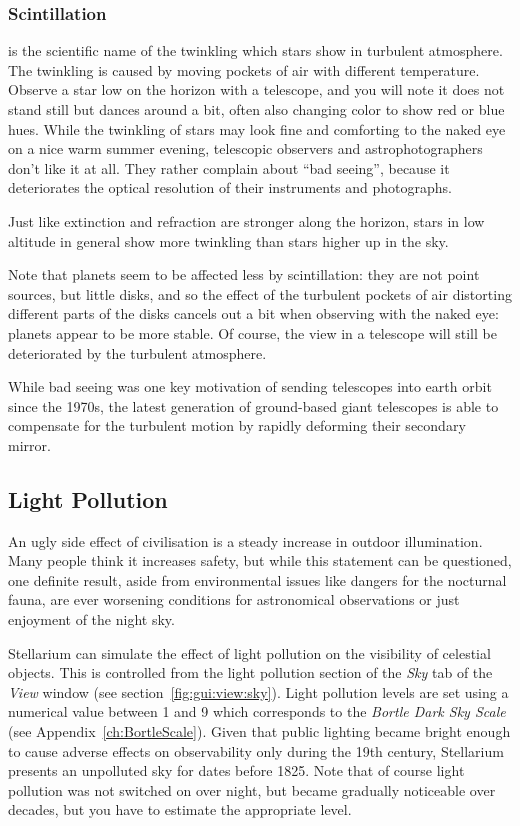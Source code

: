 \subsubsection{Scintillation}
\label{sec:phenomena:Scintillation}
 is the scientific name of the twinkling which stars show
in turbulent atmosphere. The twinkling is caused by moving pockets of air with different temperature. 
Observe a star low on the horizon with a telescope, and you will note it does not stand still 
but dances around a bit, often also changing color to show red or blue hues.
While the twinkling of stars may look fine and comforting to the naked eye on a nice warm summer evening, 
telescopic observers and astrophotographers don't like it at all. They rather complain about ``bad seeing'', 
because it deteriorates the optical resolution of their instruments and photographs. 

Just like extinction and refraction are stronger along the horizon, 
stars in low altitude in general show more twinkling than stars higher up in the sky. 

Note that planets seem to be affected less by scintillation: they are not point sources, but little disks, 
and so the effect of the turbulent pockets of air distorting different parts of the disks cancels out a bit 
when observing with the naked eye: planets appear to be more stable.
Of course, the view in a telescope will still be deteriorated by the turbulent atmosphere.

While bad seeing was one key motivation of sending telescopes into earth orbit since the 1970s, 
the latest generation of ground-based giant telescopes is able to compensate for the turbulent 
motion by rapidly deforming their secondary mirror. 



\subsection{Light Pollution}
\label{sec:phenomena:LightPollution}

An ugly side effect of civilisation is a steady increase in outdoor
illumination. Many people think it increases safety, but while this
statement can be questioned, one definite result, aside from
environmental issues like dangers for the nocturnal fauna, are ever
worsening conditions for astronomical observations or just enjoyment
of the night sky. 

Stellarium can simulate the effect of light pollution on the visibility 
of celestial objects. This is controlled from the
light pollution section of the \emph{Sky} tab of the \emph{View}
window (see section~\ref{fig:gui:view:sky}).  Light pollution levels are set using a numerical value
between 1 and 9 which corresponds to the \emph{Bortle Dark Sky Scale}
(see Appendix~\ref{ch:BortleScale}). Given that public lighting became 
bright enough to cause adverse effects on observability only during 
the 19th century, Stellarium presents an unpolluted sky for dates before 1825. 
Note that of course light pollution was not switched on over night, 
but became gradually noticeable over decades, but you have to estimate the appropriate level. 

